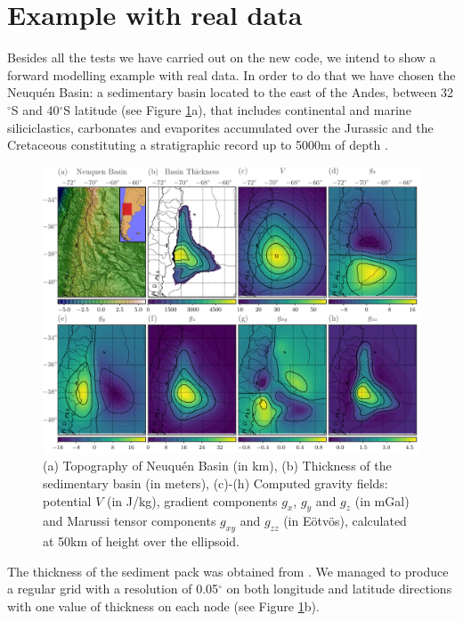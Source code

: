 \documentclass[extra]{gji}
\begin{document}

\section{Example with real data}

Besides all the tests we have carried out on the new code, we intend to show a forward modelling example with real data.
In order to do that we have chosen the Neuqu\'en Basin: a sedimentary basin located to the east of the Andes, between 32$^\circ$S and 40$^\circ$S latitude (see Figure \ref{fig:neuquen-basin}a), that includes continental and marine siliciclastics, carbonates and evaporites accumulated over the Jurassic and the Cretaceous constituting a stratigraphic record up to 5000m of depth \citep{Howell2005}.

\begin{figure}
\centering
\includegraphics[width=\linewidth]{figures/neuquen-basin.pdf}
\caption{(a) Topography of Neuqu\'en Basin (in km),
         (b) Thickness of the sedimentary basin (in meters),
         (c)-(h) Computed gravity fields: potential $V$ (in J/kg), gradient components $g_x$, $g_y$ and $g_z$ (in mGal) and Marussi tensor components $g_{xy}$ and $g_{zz}$ (in Eötvös), calculated at 50km of height over the ellipsoid.}
\label{fig:neuquen-basin}
\end{figure}

The thickness of the sediment pack was obtained from \citet{Heine2007}.
We managed to produce a regular grid with a resolution of 0.05$^\circ$ on both longitude and latitude directions with one value of thickness on each node (see Figure \ref{fig:neuquen-basin}b).
\end{document}
